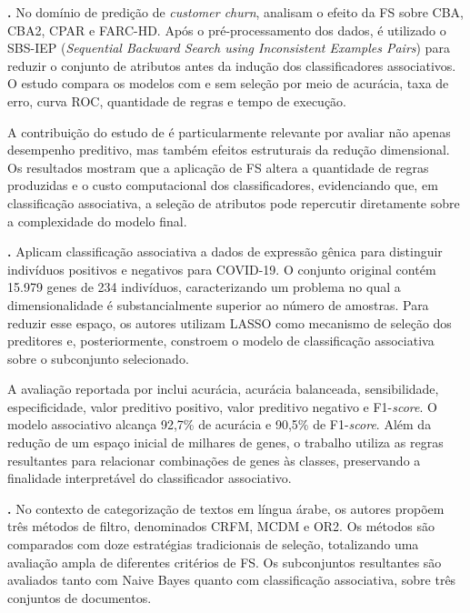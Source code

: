 \medskip

\noindent\textbf{.}
No domínio de predição de \textit{customer churn},
analisam o efeito da FS sobre CBA, CBA2, CPAR e
FARC-HD. Após o pré-processamento dos dados, é utilizado o SBS-IEP
(\textit{Sequential Backward Search using Inconsistent Examples Pairs}) para
reduzir o conjunto de atributos antes da indução dos classificadores
associativos. O estudo compara os modelos com e sem seleção por meio de
acurácia, taxa de erro, curva ROC, quantidade de regras e tempo de execução.

A contribuição do estudo de  é particularmente
relevante por avaliar não apenas desempenho preditivo, mas também efeitos
estruturais da redução dimensional. Os resultados mostram que a aplicação de FS
altera a quantidade de regras produzidas e o custo computacional dos
classificadores, evidenciando que, em classificação associativa, a seleção de
atributos pode repercutir diretamente sobre a complexidade do modelo final.

\medskip

\noindent\textbf{.}
Aplicam classificação associativa a dados de
expressão gênica para distinguir indivíduos positivos e negativos para COVID-19.
O conjunto original contém 15.979 genes de 234 indivíduos, caracterizando um
problema no qual a dimensionalidade é substancialmente superior ao número de
amostras. Para reduzir esse espaço, os autores utilizam LASSO como mecanismo de
seleção dos preditores e, posteriormente, constroem o modelo de classificação
associativa sobre o subconjunto selecionado.

A avaliação reportada por  inclui acurácia,
acurácia balanceada, sensibilidade, especificidade, valor preditivo positivo,
valor preditivo negativo e F1-\textit{score}. O modelo associativo alcança
92,7\% de acurácia e 90,5\% de F1-\textit{score}. Além da redução de um espaço
inicial de milhares de genes, o trabalho utiliza as regras resultantes para
relacionar combinações de genes às classes, preservando a finalidade
interpretável do classificador associativo.

\medskip

\noindent\textbf{.}
No contexto de categorização de textos em língua árabe,
os autores propõem três métodos de filtro, denominados
CRFM, MCDM e OR2. Os métodos são comparados com doze estratégias tradicionais
de seleção, totalizando uma avaliação ampla de diferentes critérios de FS. Os
subconjuntos resultantes são avaliados tanto com Naive Bayes quanto com
classificação associativa, sobre três conjuntos de documentos.

